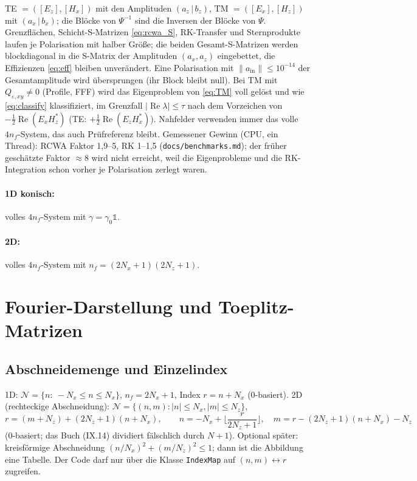 TE $=([E_z],[H_x])$ mit den Amplituden $(a_z\,|\,b_z)$, TM $=([E_x],[H_z])$ mit $(a_x\,|\,b_x)$; die Blöcke
von $\Psi^{-1}$ sind die Inversen der Blöcke von $\Psi$. Grenzflächen, Schicht-S-Matrizen \eqref{eq:rcwa_S},
RK-Transfer und Sternprodukte laufen je Polarisation mit halber Größe; die beiden Gesamt-S-Matrizen werden
blockdiagonal in die S-Matrix der Amplituden $(a_x,a_z)$ eingebettet, die Effizienzen \eqref{eq:eff} bleiben
unverändert. Eine Polarisation mit $\lVert a_{\text{in}}\rVert\le10^{-14}$ der Gesamtamplitude wird
übersprungen (ihr Block bleibt null). Bei TM mit $Q_{\varepsilon,xy}\neq0$ (Profile, FFF) wird das
Eigenproblem von \eqref{eq:TM} voll gelöst und wie \eqref{eq:classify} klassifiziert, im Grenzfall
$|\operatorname{Re}\lambda|\le\tau$ nach dem Vorzeichen von $-\tfrac12\operatorname{Re}(E_xH_z^*)$
(TE: $+\tfrac12\operatorname{Re}(E_zH_x^*)$). Nahfelder verwenden immer das volle $4n_f$-System, das auch
Prüfreferenz bleibt. Gemessener Gewinn (CPU, ein Thread): RCWA Faktor 1,9--5, RK 1--1,5
(\verb|docs/benchmarks.md|); der früher geschätzte Faktor $\approx8$ wird nicht erreicht, weil die
Eigenprobleme und die RK-Integration schon vorher je Polarisation zerlegt waren.
\paragraph{1D konisch:} volles $4n_f$-System mit $\gamma=\gamma_0\mathbb 1$.
\paragraph{2D:} volles $4n_f$-System mit $n_f=(2N_x+1)(2N_z+1)$.

\section{Fourier-Darstellung und Toeplitz-Matrizen}\label{sec:fourier}

\subsection{Abschneidemenge und Einzelindex}\label{sec:indexmap}
1D: $\mathcal N=\{n:\ -N_x\le n\le N_x\}$, $n_f=2N_x+1$, Index $r=n+N_x$ (0-basiert).
2D (rechteckige Abschneidung): $\mathcal N=\{(n,m):|n|\le N_x,|m|\le N_z\}$,
\begin{equation}
  r=(m+N_z)+(2N_z+1)(n+N_x),\qquad
  n=-N_x+\Big\lfloor\frac{r}{2N_z+1}\Big\rfloor,\quad m=r-(2N_z+1)(n+N_x)-N_z
  \label{eq:indexmap}
\end{equation}
(0-basiert; das Buch (IX.14) dividiert fälschlich durch $N+1$). Optional später: kreisförmige
Abschneidung $(n/N_x)^2+(m/N_z)^2\le1$; dann ist die Abbildung eine Tabelle. Der Code darf nur
über die Klasse \verb|IndexMap| auf $(n,m)\leftrightarrow r$ zugreifen.

